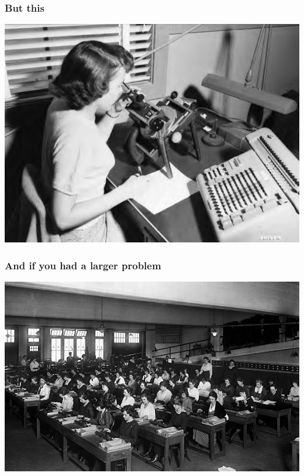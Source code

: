 \documentclass[rgb,dvipsnames]{beamer}
\begin{document}
\begin{frame}
  \frametitle{But this}

  \includegraphics[width=\textwidth]{img/human-computer.jpg}
\end{frame}

\begin{frame}
  \frametitle{And if you had a larger problem}

  \includegraphics[width=\textwidth]{img/human-computers.jpg}
\end{frame}
\end{document}
